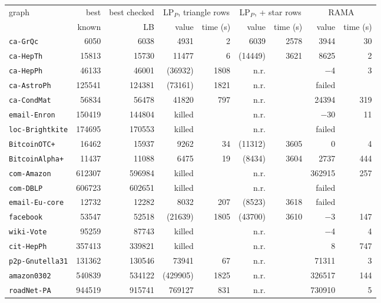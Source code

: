 \begin{tabular}{lrrrrrrrr}
\toprule
graph & best & best checked & \multicolumn{2}{c}{LP$_P$, triangle rows} & \multicolumn{2}{c}{LP$_P$, + star rows} & \multicolumn{2}{c}{RAMA} \\
\cmidrule(lr){4-5}\cmidrule(lr){6-7}\cmidrule(lr){8-9}
 & known & LB & value & time (s) & value & time (s) & value & time (s) \\
\midrule
\texttt{ca-GrQc} & \num{6050} & \num{6038} & \num{4931} & 2 & \num{6039} & 2578 & \num{3944} & 30 \\
\texttt{ca-HepTh} & \num{15813} & \num{15730} & \num{11477} & 6 & (\num{14449}) & 3621 & \num{8625} & 2 \\
\texttt{ca-HepPh} & \num{46133} & \num{46001} & (\num{36932}) & 1808 & n.r. &  & \num{-4} & 3 \\
\texttt{ca-AstroPh} & \num{125541} & \num{124381} & (\num{73161}) & 1821 & n.r. &  & failed &  \\
\texttt{ca-CondMat} & \num{56834} & \num{56478} & \num{41820} & 797 & n.r. &  & \num{24394} & 319 \\
\texttt{email-Enron} & \num{150419} & \num{144804} & killed &  & n.r. &  & \num{-30} & 11 \\
\texttt{loc-Brightkite} & \num{174695} & \num{170553} & killed &  & n.r. &  & failed &  \\
\texttt{BitcoinOTC+} & \num{16462} & \num{15937} & \num{9262} & 34 & (\num{11312}) & 3605 & \num{0} & 4 \\
\texttt{BitcoinAlpha+} & \num{11437} & \num{11088} & \num{6475} & 19 & (\num{8434}) & 3604 & \num{2737} & 444 \\
\texttt{com-Amazon} & \num{612307} & \num{596984} & killed &  & n.r. &  & \num{362915} & 257 \\
\texttt{com-DBLP} & \num{606723} & \num{602651} & killed &  & n.r. &  & failed &  \\
\texttt{email-Eu-core} & \num{12732} & \num{12282} & \num{8032} & 207 & (\num{8523}) & 3618 & failed &  \\
\texttt{facebook} & \num{53547} & \num{52518} & (\num{21639}) & 1805 & (\num{43700}) & 3610 & \num{-3} & 147 \\
\texttt{wiki-Vote} & \num{95259} & \num{87743} & killed &  & n.r. &  & \num{-4} & 4 \\
\texttt{cit-HepPh} & \num{357413} & \num{339821} & killed &  & n.r. &  & \num{8} & 747 \\
\texttt{p2p-Gnutella31} & \num{131362} & \num{130546} & \num{73941} & 67 & n.r. &  & \num{71311} & 3 \\
\texttt{amazon0302} & \num{540839} & \num{534122} & (\num{429905}) & 1825 & n.r. &  & \num{326517} & 144 \\
\texttt{roadNet-PA} & \num{944519} & \num{915741} & \num{769127} & 831 & n.r. &  & \num{730910} & 5 \\
\bottomrule
\end{tabular}
